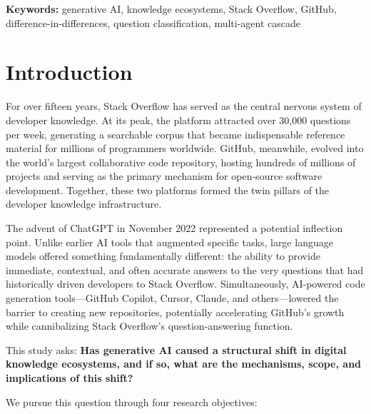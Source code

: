 \documentclass[11pt,a4paper]{article}
\begin{document}
\noindent\textbf{Keywords:} generative AI, knowledge ecosystems, Stack Overflow, GitHub, difference-in-differences, question classification, multi-agent cascade

\newpage
\tableofcontents
\newpage

\section{Introduction}
\label{sec:intro}

For over fifteen years, Stack Overflow has served as the central nervous system of developer knowledge. At its peak, the platform attracted over 30,000 questions per week, generating a searchable corpus that became indispensable reference material for millions of programmers worldwide. GitHub, meanwhile, evolved into the world's largest collaborative code repository, hosting hundreds of millions of projects and serving as the primary mechanism for open-source software development. Together, these two platforms formed the twin pillars of the developer knowledge infrastructure.

The advent of ChatGPT in November 2022 represented a potential inflection point. Unlike earlier AI tools that augmented specific tasks, large language models offered something fundamentally different: the ability to provide immediate, contextual, and often accurate answers to the very questions that had historically driven developers to Stack Overflow. Simultaneously, AI-powered code generation tools---GitHub Copilot, Cursor, Claude, and others---lowered the barrier to creating new repositories, potentially accelerating GitHub's growth while cannibalizing Stack Overflow's question-answering function.

This study asks: \textbf{Has generative AI caused a structural shift in digital knowledge ecosystems, and if so, what are the mechanisms, scope, and implications of this shift?}

We pursue this question through four research objectives:
\end{document}
